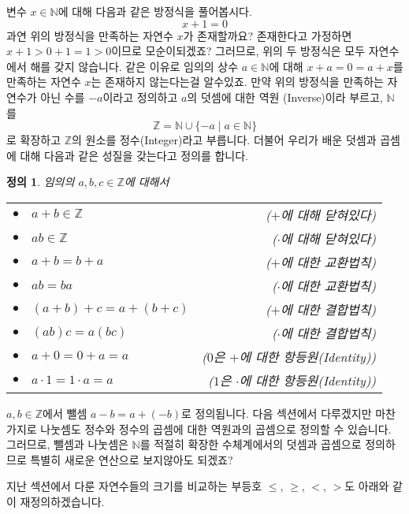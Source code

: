 \documentclass[a4paper, 11pt]{report}
\renewcommand{\<}{\langle}
\renewcommand{\>}{\rangle}
\newtheorem{dfn}[thm]{정의}
\begin{document}
변수 $x \in \mathbb{N}$에 대해 다음과 같은 방정식을 풀어봅시다.
$$
x + 1 = 0
$$
과연 위의 방정식을 만족하는 자연수 $x$가 존재할까요? 존재한다고 가정하면 $x + 1 > 0 + 1 = 1 > 0$이므로 
모순이되겠죠? 그러므로, 위의 두 방정식은 모두 자연수에서 해를 갖지 않습니다.
같은 이유로 임의의 상수 $a \in \mathbb{N}$에 대해 $x + a = 0 = a + x$를 만족하는 자연수 $x$는 존재하지
않는다는걸 알수있죠. 만약 위의 방정식을 만족하는 자연수가 아닌 수를 $-a$이라고 정의하고 $a$의 덧셈에 대한 
역원 (Inverse)이라 부르고, $\mathbb{N}$를 
$$
\mathbb{Z} = \mathbb{N} \cup \{-a \mid a \in \mathbb{N}\}
$$
로 확장하고 $\mathbb{Z}$의 원소를 정수(Integer)라고 부릅니다. 더불어 우리가 배운 덧셈과 곱셈에 대해 다음과
같은 성질을 갖는다고 정의를 합니다.

\begin{dfn}\label{axiom_int_0}
임의의 $a, b, c \in \mathbb{Z}$에 대해서
\begin{center}
\begin{tabular}{clr}
  $\bullet$ & $a + b \in \mathbb{Z}$ & ($+$에 대해 닫혀있다)\\
  $\bullet$ & $ab \in \mathbb{Z}$ & ($\cdot$에 대해 닫혀있다)\\
  $\bullet$ & $a + b = b + a$ & ($+$에 대한 교환법칙)\\
  $\bullet$ & $ab = ba$ & ($\cdot$에 대한 교환법칙)\\
  $\bullet$ & $(a + b) + c = a + (b + c)$ & ($+$에 대한 결합법칙)\\
  $\bullet$ & $(ab)c = a(bc)$ & ($\cdot$에 대한 결합법칙)\\
  $\bullet$ & $a + 0 = 0 + a = a$ & ($0$은 $+$에 대한 항등원(Identity))\\
  $\bullet$ & $a\cdot 1 = 1\cdot a = a$ & ($1$은 $\cdot$에 대한 항등원(Identity))\\
\end{tabular}
\end{center}
\end{dfn}

$a, b \in \mathbb{Z}$에서 뺄셈 $a - b = a + (-b)$로 정의됩니다. 다음 섹션에서 다루겠지만 마찬가지로 나눗셈도 정수와 정수의 곱셈에 대한 역원과의 곱셈으로 정의할 수 있습니다.
그러므로, 뺄셈과 나눗셈은 $\mathbb{N}$를 적절히 확장한 수체계에서의 덧셈과 곱셈으로 정의하므로 특별히 새로운
연산으로 보지않아도 되겠죠? 

지난 섹션에서 다룬 자연수들의 크기를 비교하는 부등호 $\le$, $\ge$, $<$, $>$도 아래와 같이 재정의하겠습니다.
\end{document}
